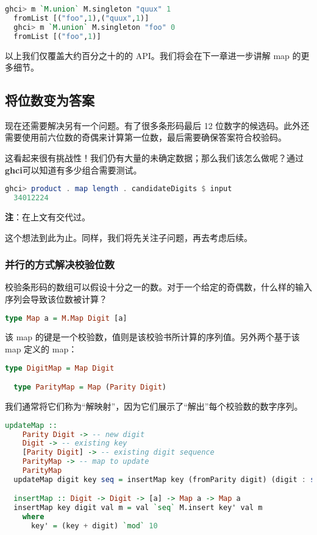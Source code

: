 \documentclass[./main.tex]{subfiles}
\begin{document}
\begin{lstlisting}[language=Haskell]
  ghci> m `M.union` M.singleton "quux" 1
  fromList [("foo",1),("quux",1)]
  ghci> m `M.union` M.singleton "foo" 0
  fromList [("foo",1)]
\end{lstlisting}

以上我们仅覆盖大约百分之十的的 API。我们将会在下一章进一步讲解 map 的更多细节。

\subsection*{将位数变为答案}

现在还需要解决另有一个问题。有了很多条形码最后 12 位数字的候选码。此外还需要使用前六位数的奇偶来计算第一位数，最后需要确保答案符合校验码。

这看起来很有挑战性！我们仍有大量的未确定数据；那么我们该怎么做呢？通过\textbf{ghci}可以知道有多少组合需要测试。

\begin{lstlisting}[language=Haskell]
  ghci> product . map length . candidateDigits $ input
  34012224
\end{lstlisting}

\textbf{注}：在上文有交代过。

这个想法到此为止。同样，我们将先关注子问题，再去考虑后续。

\subsubsection*{并行的方式解决校验位数}

校验条形码的数组可以假设十分之一的数。对于一个给定的奇偶数，什么样的输入序列会导致该位数被计算？

\begin{lstlisting}[language=Haskell]
  type Map a = M.Map Digit [a]
\end{lstlisting}

该 map 的键是一个校验数，值则是该校验书所计算的序列值。另外两个基于该 map 定义的 map：

\begin{lstlisting}[language=Haskell]
  type DigitMap = Map Digit

  type ParityMap = Map (Parity Digit)
\end{lstlisting}

我们通常将它们称为“解映射”，因为它们展示了“解出”每个校验数的数字序列。

\begin{lstlisting}[language=Haskell]
  updateMap ::
    Parity Digit -> -- new digit
    Digit -> -- existing key
    [Parity Digit] -> -- existing digit sequence
    ParityMap -> -- map to update
    ParityMap
  updateMap digit key seq = insertMap key (fromParity digit) (digit : seq)

  insertMap :: Digit -> Digit -> [a] -> Map a -> Map a
  insertMap key digit val m = val `seq` M.insert key' val m
    where
      key' = (key + digit) `mod` 10
\end{lstlisting}
\end{document}

